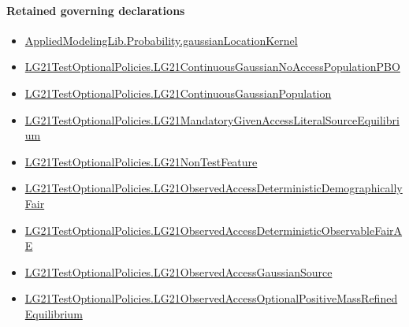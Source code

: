 \documentclass[10pt]{article}
\begin{document}
\paragraph{Retained governing declarations}
\begin{itemize}\raggedright
\item \hyperlink{governing-declaration-6c289c06beead2ba}{Applied\allowbreak{}Modeling\allowbreak{}Lib.\allowbreak{}Probability.\allowbreak{}gaussian\allowbreak{}Location\allowbreak{}Kernel}
\item \hyperlink{governing-declaration-625eb26543c1b3dc}{LG21\allowbreak{}Test\allowbreak{}Optional\allowbreak{}Policies.\allowbreak{}LG21\allowbreak{}Continuous\allowbreak{}Gaussian\allowbreak{}No\allowbreak{}Access\allowbreak{}Population\allowbreak{}PBO}
\item \hyperlink{paper-prerequisite-f5e1c886d250142b}{LG21\allowbreak{}Test\allowbreak{}Optional\allowbreak{}Policies.\allowbreak{}LG21\allowbreak{}Continuous\allowbreak{}Gaussian\allowbreak{}Population}
\item \hyperlink{governing-declaration-97e3a6cd16347ca5}{LG21\allowbreak{}Test\allowbreak{}Optional\allowbreak{}Policies.\allowbreak{}LG21\allowbreak{}Mandatory\allowbreak{}Given\allowbreak{}Access\allowbreak{}Literal\allowbreak{}Source\allowbreak{}Equilibrium}
\item \hyperlink{governing-declaration-81cb73bf3869c56d}{LG21\allowbreak{}Test\allowbreak{}Optional\allowbreak{}Policies.\allowbreak{}LG21\allowbreak{}Non\allowbreak{}Test\allowbreak{}Feature}
\item \hyperlink{governing-declaration-247a7eac4d145774}{LG21\allowbreak{}Test\allowbreak{}Optional\allowbreak{}Policies.\allowbreak{}LG21\allowbreak{}Observed\allowbreak{}Access\allowbreak{}Deterministic\allowbreak{}Demographically\allowbreak{}Fair}
\item \hyperlink{governing-declaration-29d8806c85547957}{LG21\allowbreak{}Test\allowbreak{}Optional\allowbreak{}Policies.\allowbreak{}LG21\allowbreak{}Observed\allowbreak{}Access\allowbreak{}Deterministic\allowbreak{}Observable\allowbreak{}Fair\allowbreak{}AE}
\item \hyperlink{governing-declaration-2b8ecce015c6e865}{LG21\allowbreak{}Test\allowbreak{}Optional\allowbreak{}Policies.\allowbreak{}LG21\allowbreak{}Observed\allowbreak{}Access\allowbreak{}Gaussian\allowbreak{}Source}
\item \hyperlink{governing-declaration-54d577fbb0a632ec}{LG21\allowbreak{}Test\allowbreak{}Optional\allowbreak{}Policies.\allowbreak{}LG21\allowbreak{}Observed\allowbreak{}Access\allowbreak{}Optional\allowbreak{}Positive\allowbreak{}Mass\allowbreak{}Refined\allowbreak{}Equilibrium}

\end{itemize}
\end{document}

